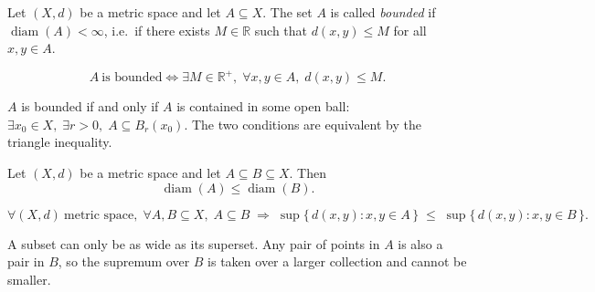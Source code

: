 \begin{tcolorbox}[colback=propbox, colframe=propborder, arc=2pt,
  left=6pt, right=6pt, top=4pt, bottom=4pt,
  title={\small\textbf{Definition (Bounded Set)}},
  fonttitle=\small\bfseries]
\begin{definition}
\label{def:bounded-set}
Let $(X,d)$ be a metric space and let $A \subseteq X$.
The set $A$ is called \emph{bounded} if $\operatorname{diam}(A) < \infty$,
i.e.\ if there exists $M \in \mathbb{R}$ such that $d(x,y) \le M$ for all
$x, y \in A$.
\end{definition}
\end{tcolorbox}

\begin{remark*}
\[
A\ \text{is bounded}
\iff
\exists M \in \mathbb{R}^+,\;
\forall x, y \in A,\;
d(x,y) \le M.
\]
\end{remark*}

\begin{remark*}
$A$ is bounded if and only if $A$ is contained in some open ball:
$\exists x_0 \in X,\; \exists r > 0,\; A \subseteq B_r(x_0)$.
The two conditions are equivalent by the triangle inequality.
\end{remark*}

\begin{tcolorbox}[colback=thmbox, colframe=thmborder, arc=2pt,
  left=6pt, right=6pt, top=4pt, bottom=4pt,
  title={\small\textbf{Theorem (Monotonicity of Diameter)}},
  fonttitle=\small\bfseries]
\begin{theorem}
\label{thm:monotonicity-of-diameter}
Let $(X,d)$ be a metric space and let $A \subseteq B \subseteq X$.
Then
\[
\operatorname{diam}(A) \le \operatorname{diam}(B).
\]
\end{theorem}
\end{tcolorbox}

\begin{remark*}
\[
\forall (X,d)\ \text{metric space},\;
\forall A, B \subseteq X,\;
A \subseteq B
\;\Rightarrow\;
\sup\{\,d(x,y):x,y\in A\,\}
\;\le\;
\sup\{\,d(x,y):x,y\in B\,\}.
\]
\end{remark*}

\begin{remark*}[Intuition]
A subset can only be as wide as its superset.
Any pair of points in $A$ is also a pair in $B$, so the supremum
over $B$ is taken over a larger collection and cannot be smaller.
\end{remark*}



